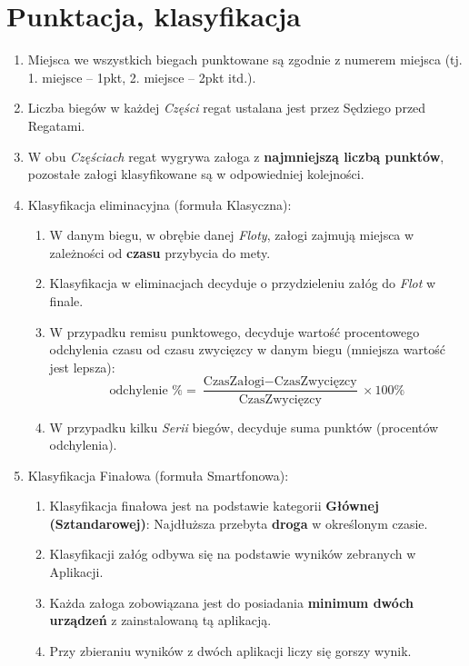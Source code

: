 \documentclass[12pt,a4paper]{article}
\begin{document}
\section{Punktacja, klasyfikacja}
\begin{enumerate}
    \item Miejsca we wszystkich biegach punktowane są zgodnie z numerem miejsca (tj. 1. miejsce -- 1pkt, 2. miejsce -- 2pkt itd.).
    \item Liczba biegów w każdej \textit{Części} regat ustalana jest przez Sędziego przed Regatami.
    \item W obu \textit{Częściach} regat wygrywa załoga z \textbf{najmniejszą liczbą punktów}, pozostałe załogi klasyfikowane są w odpowiedniej kolejności. 
    \item Klasyfikacja eliminacyjna (formuła Klasyczna): \label{punktacja:eliminacje}
    \begin{enumerate}
        \item W danym biegu, w obrębie danej \textit{Floty}, załogi zajmują miejsca w zależności od \textbf{czasu} przybycia do mety.
        \item Klasyfikacja w eliminacjach decyduje o przydzieleniu załóg do \textit{Flot} w finale.
        \item W przypadku remisu punktowego, decyduje wartość procentowego odchylenia czasu od czasu zwycięzcy w danym biegu (mniejsza wartość jest lepsza):
        \begin{equation*}
        \text{odchylenie \%} = \frac{\text{CzasZałogi} - \text{CzasZwycięzcy}}{\text{CzasZwycięzcy}} \times 100\%
        \end{equation*}
        \item W przypadku kilku \textit{Serii} biegów, decyduje suma punktów (procentów odchylenia).
    \end{enumerate}
    \item Klasyfikacja Finałowa (formuła Smartfonowa):
    \begin{enumerate}
        \item Klasyfikacja finałowa jest na podstawie kategorii \textbf{Głównej (Sztandarowej)}: Najdłuższa przebyta \textbf{droga} w określonym czasie.
        \item Klasyfikacji załóg odbywa się na podstawie wyników zebranych w Aplikacji.
        \item Każda załoga zobowiązana jest do posiadania \textbf{minimum dwóch urządzeń} z zainstalowaną tą aplikacją.
        \item Przy zbieraniu wyników z dwóch aplikacji liczy się gorszy wynik.

\end{enumerate}
\end{enumerate}
\end{document}
